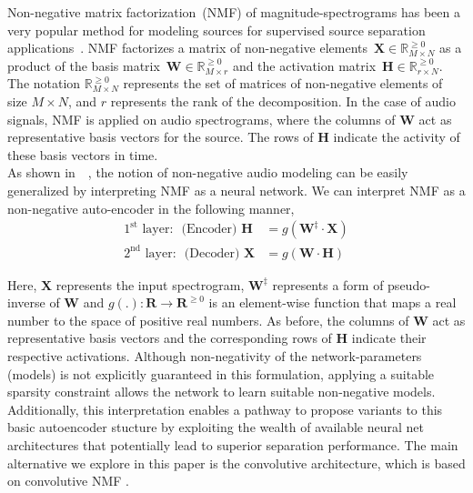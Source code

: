 \documentclass{article}
\begin{document}
Non-negative matrix factorization~(NMF) of magnitude-spectrograms has been a very popular method for modeling sources for supervised source separation applications~\cite{smaragdis2014static, virtanen2015compositional}. NMF factorizes a matrix of non-negative elements~$\mathbf{X}\in \mathbb{R}_{M\times N}^{\geq0}$ as a product of the basis matrix~$\mathbf{W}\in \mathbb{R}_{M \times r}^{\geq{0}}$ and the activation matrix~$\mathbf{H}\in \mathbb{R}_{r \times N}^{\geq{0}}$. The notation $\mathbb{R}_{M \times N}^{\geq0}$ represents the set of matrices of non-negative elements of size $M \times N$, and $r$ represents the rank of the decomposition. In the case of audio signals, NMF is applied on audio spectrograms, where the columns of $\mathbf{W}$ act as representative basis vectors for the source. The rows of $\mathbf{H}$ indicate the activity of these basis vectors in time.  \\

As shown in~~\cite{smaragdis2017aneural}, the notion of non-negative audio modeling can be easily generalized by interpreting NMF as a neural network. We can interpret NMF as a non-negative auto-encoder in the following manner,
\begin{align}
    \text{$1^{\text{st}}$ layer:~ (Encoder)~}\mathbf{H} &= g(\mathbf{W^{\ddagger}} \cdot \mathbf{X}) \nonumber \\
    \text{$2^{\text{nd}}$ layer:~ (Decoder)~}\mathbf{X} &= g(\mathbf{W} \cdot \mathbf{H})
    \label{eq:nmfae}
\end{align}

Here, $\mathbf{X}$ represents the input spectrogram, $\mathbf{W^{\ddagger}}$ represents a form of pseudo-inverse of $\mathbf{W}$ and $g(.):\mathbf{R}\rightarrow \mathbf{R}^{\geq0}$ is an element-wise function that maps a real number to the space of positive real numbers. As before, the columns of $\mathbf{W}$ act as representative basis vectors and the corresponding rows of $\mathbf{H}$ indicate their respective activations. Although non-negativity of the network-parameters (models) is not explicitly guaranteed in this formulation, applying a suitable sparsity constraint allows the network to learn suitable non-negative models. Additionally, this interpretation enables a pathway to propose variants to this basic autoencoder stucture by exploiting the wealth of available neural net architectures that potentially lead to superior separation performance. The main alternative we explore in this paper is the convolutive architecture, which is based on convolutive NMF \cite{smaragdis2007convolutive}.  \\
\end{document}
